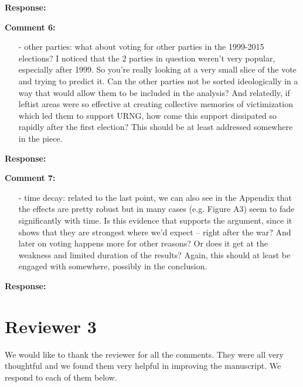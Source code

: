 \documentclass[12pt, a4paper, notitlepage]{article}
\begin{document}
\noindent\textbf{Response:}

\vspace{15pt}
\noindent\textbf{Comment 6:}
\begin{displayquote}
\begin{itemize}
\item[-] other parties: what about voting for other parties in the 1999-2015 elections? I noticed that the 2 parties in question weren’t very popular, especially after 1999. So you’re really looking at a very small slice of the vote and trying to predict it. Can the other parties not be sorted ideologically in a way that would allow them to be included in the analysis? And relatedly, if leftist areas were so effective at creating collective memories of victimization which led them to support URNG, how come this support dissipated so rapidly after the first election? This should be at least addressed somewhere in the piece.
\end{itemize}
\end{displayquote}

\noindent\textbf{Response:}

\vspace{15pt}
\noindent\textbf{Comment 7:}
\begin{displayquote}
\begin{itemize}
\item[-] time decay: related to the last point, we can also see in the Appendix that the effects are pretty robust but in many cases (e.g. Figure A3) seem to fade significantly with time. Is this evidence that supports the argument, since it shows that they are strongest where we’d expect – right after the war? And later on voting happens more for other reasons? Or does it get at the weakness and limited duration of the results? Again, this should at least be engaged with somewhere, possibly in the conclusion.
\end{itemize}
\end{displayquote}

\noindent\textbf{Response:}


\newpage
\section*{Reviewer 3}

\textbf{{\color{red}{CHANGE }}} We would like to thank the reviewer for all the comments. They were all very thoughtful and we found them very helpful in improving the manuscript. We respond to each of them below.
\end{document}
